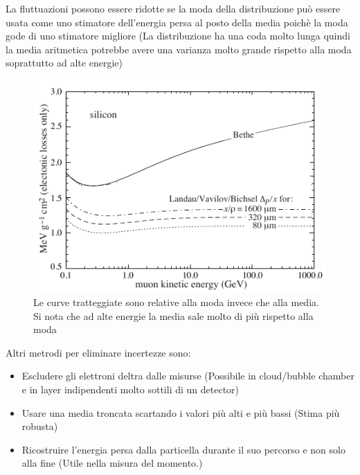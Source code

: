 La fluttuazioni possono essere ridotte se la moda della distribuzione può essere usata come uno stimatore dell'energia persa al posto della media poichè la moda gode di uno stimatore migliore (La distribuzione ha una coda molto lunga quindi la media aritmetica potrebbe avere una varianza molto grande rispetto alla moda soprattutto ad alte energie)

\hspace{-20pt}
\begin{minipage}{0.52\textwidth}
    \begin{figure}[H]
        \centering
        \includegraphics[width=\textwidth,frame]{Chapters/images/Interazione_radiazione_materia/image-20220217014236788.png}
        \captionsetup{width=\textwidth}
        \caption{Le curve tratteggiate sono relative alla moda invece che alla media. Si nota che ad alte energie la media sale molto di più rispetto alla moda}
        \label{fig:landaumode}
    \end{figure}
\end{minipage} \hfill
\begin{minipage}{0.48\textwidth}
    Altri metrodi per eliminare incertezze sono:
\begin{itemize}
    \item Escludere gli elettroni deltra dalle misurse (Possibile in cloud/bubble chamber e in layer indipendenti molto sottili di un detector)
    \item Usare una media troncata scartando i valori più alti e più bassi (Stima più robusta)
    \item Ricostruire l'energia persa dalla particella durante il suo percorso e non solo alla fine (Utile nella misura del momento.)
\end{itemize}


\end{minipage}
